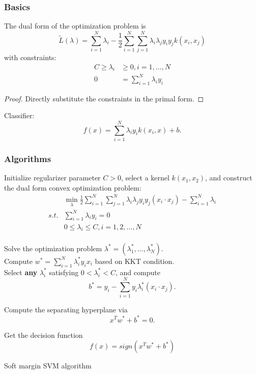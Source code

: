 \begin{refsection}
\subsubsection{Basics}
\begin{lemma}\cite[333]{bishop2006pattern}
	The dual form of the optimization problem is
	$$\tilde{L}(\lambda) = \sum_{i=1}^N \lambda_i - \frac{1}{2}\sum_{i=1}^N\sum_{j=1}^N \lambda_i\lambda_j y_iy_j k(x_i,x_j)$$
	with constraints:
	\begin{align*}
	C\geq \lambda_i &\geq 0, i = 1,...,N\\
	0 &= \sum_{i=1}^N \lambda_iy_i
	\end{align*}
\end{lemma}
\begin{proof}
	Directly substitute the constraints in the primal form.
\end{proof}

Classifier:
$$f(x) = \sum_{i=1}^N \lambda_i y_i k(x_i,x) + b.$$


\subsubsection{Algorithms}
\begin{algorithm}[H]
	\SetAlgoLined
	Initialize regularizer parameter $C>0$, select a kernel $k(x_1,x_2)$, and construct the dual form convex optimization problem:
	\begin{align*}
	& \min_{\lambda} \frac{1}{2}\sum_{i=1}^N\sum_{j=1}^N \lambda_i\lambda_j y_iy_j(x_i\cdot x_j) - \sum_{i=1}^N \lambda_i \\
	s.t. &  \sum_{i=1}^N \lambda_i y_i = 0\\
	& 0 \leq \lambda_i \leq C, i=1,2,...,N
	\end{align*}\\
	Solve the optimization problem $\lambda^*=(\lambda_1^*,...,\lambda_N^*)$.\\
	Compute $w^* = \sum_{i=1}^N \lambda_i^* y_ix_i$ based on KKT condition.\\
	Select \textbf{any} $\lambda_i^*$ satisfying $0<\lambda_i^*<C$, and compute
	$$b^* = y_i - \sum_{i=1}^N y_i \lambda_i^* (x_i\cdot x_j).$$
	
	Compute the separating hyperplane via
	$$x^Tw^* + b^* = 0.$$
	
	Get the decision function
	$$f(x) = sign(x^Tw^* + b^*)$$
	
	\caption{Soft margin SVM algorithm}
\end{algorithm}



\end{refsection}
